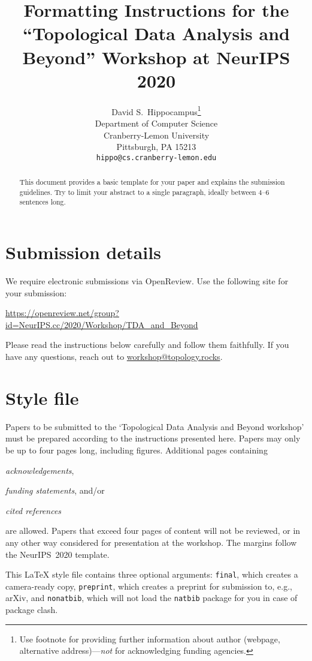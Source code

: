 \documentclass{article}
\title{
  Formatting Instructions for the ``Topological Data Analysis and Beyond''
  Workshop at NeurIPS 2020
}
\author{%
  David S.~Hippocampus\thanks{Use footnote for providing further information
    about author (webpage, alternative address)---\emph{not} for acknowledging
    funding agencies.} \\
  Department of Computer Science\\
  Cranberry-Lemon University\\
  Pittsburgh, PA 15213 \\
  \texttt{hippo@cs.cranberry-lemon.edu} \\
}
\begin{document}
\maketitle

\begin{abstract}
  This document provides a basic template for your paper and explains
  the submission guidelines. Try to limit your abstract to a single paragraph,
  ideally between 4--6 sentences long.
\end{abstract}

\section{Submission details}

We require electronic submissions via OpenReview. Use the following site
for your submission:
%
\begin{center}
  \url{https://openreview.net/group?id=NeurIPS.cc/2020/Workshop/TDA_and_Beyond}
\end{center}
%
Please read the instructions below carefully and follow them faithfully.
If you have any questions, reach out to \href{mailto:workshop@topology.rocks}{workshop@topology.rocks}.

\section{Style file}

Papers to be submitted to the `Topological Data Analysis and Beyond
workshop' must be prepared according to the instructions presented here.
Papers may only be up to four pages long, including figures.
%
Additional pages containing
%
\begin{inparaenum}[(i)]
  \item \emph{acknowledgements},
  \item \emph{funding statements}, and/or
  \item \emph{cited references}
\end{inparaenum}
%
are allowed.
%
Papers that exceed four pages of content will not be reviewed, or in
any other way considered for presentation at the workshop. The margins
follow the NeurIPS~2020 template.

This \LaTeX{} style file contains three optional arguments: \verb+final+, which
creates a camera-ready copy, \verb+preprint+, which creates a preprint for
submission to, e.g., arXiv, and \verb+nonatbib+, which will not load the
\verb+natbib+ package for you in case of package clash.
\end{document}
